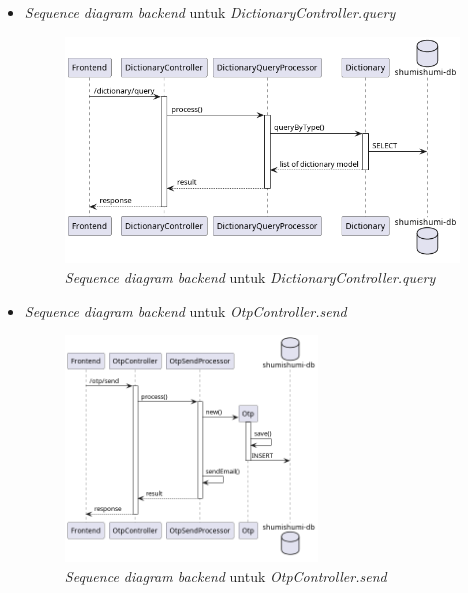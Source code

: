\documentclass[a4paper]{article}
\begin{document}
\begin{enumerate}
\begin{enumerate}
\begin{itemize}
            \newpage
            \item \textit{Sequence diagram backend} untuk \textit{DictionaryController.query}
            \begin{figure}[h]
                \centering
                \includegraphics*[height=6cm]{diagram/sequence diagram/BE/dictionary controller/query/query.png}
                \caption{\textit{Sequence diagram backend} untuk \textit{DictionaryController.query}}
            \end{figure}

            \item \textit{Sequence diagram backend} untuk \textit{OtpController.send}
            \begin{figure}[h]
                \centering
                \includegraphics*[height=6cm]{diagram/sequence diagram/BE/otp controller/send/send.png}
                \caption{\textit{Sequence diagram backend} untuk \textit{OtpController.send}}
            \end{figure}


\end{itemize}
\end{enumerate}
\end{enumerate}
\end{document}
